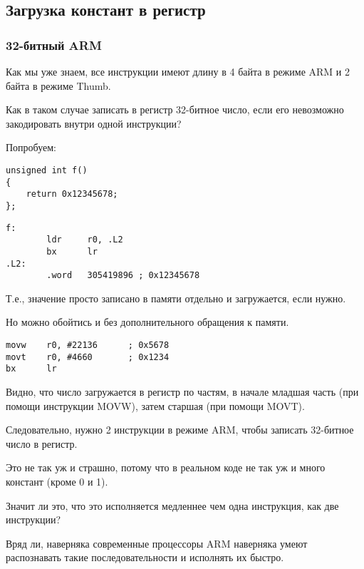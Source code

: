 ﻿\subsection{Загрузка констант в регистр}
\label{ARM_big_constants}

\subsubsection{32-битный ARM}
\label{ARM_big_constants_loading}

Как мы уже знаем, все инструкции имеют длину в 4 байта в режиме ARM и 2 байта в режиме Thumb.

Как в таком случае записать в регистр 32-битное число, если его невозможно закодировать
внутри одной инструкции?

Попробуем:

\begin{lstlisting}
unsigned int f()
{
	return 0x12345678;
};
\end{lstlisting}

\begin{lstlisting}[caption=GCC 4.6.3 -O3 \ARMMode]
f:
        ldr     r0, .L2
        bx      lr
.L2:
        .word   305419896 ; 0x12345678
\end{lstlisting}

Т.е., значение  просто записано в памяти отдельно и загружается, если нужно.

Но можно обойтись и без дополнительного обращения к памяти.

\begin{lstlisting}[caption=GCC 4.6.3 -O3 -march{=}armv7-a (\ARMMode)]
movw    r0, #22136      ; 0x5678
movt    r0, #4660       ; 0x1234
bx      lr
\end{lstlisting}

Видно, что число загружается в регистр по частям, в начале младшая часть 
(при помощи инструкции MOVW), затем старшая (при помощи MOVT).

Следовательно, нужно 2 инструкции в режиме ARM, чтобы записать 32-битное число в регистр.

Это не так уж и страшно, потому что в реальном коде не так уж и много констант (кроме 0 и 1).

Значит ли это, что это исполняется медленнее чем одна инструкция, как две инструкции?

Вряд ли, наверняка современные процессоры ARM наверняка умеют распознавать такие 
последовательности и исполнять их быстро.


